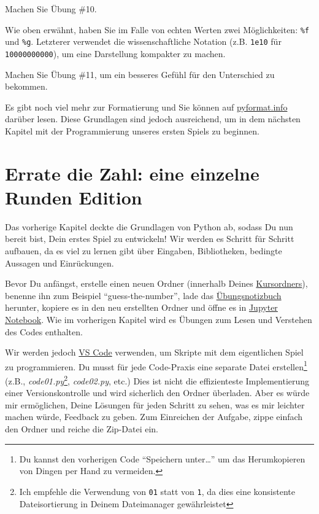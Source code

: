 \documentclass[
]{book}
\begin{document}
Machen Sie Übung \#10.

Wie oben erwähnt, haben Sie im Falle von echten Werten zwei Möglichkeiten: \texttt{\%f} und \texttt{\%g}. Letzterer verwendet die wissenschaftliche Notation (z.B. \texttt{1e10} für \texttt{10000000000}), um eine Darstellung kompakter zu machen.

Machen Sie Übung \#11, um ein besseres Gefühl für den Unterschied zu bekommen.

Es gibt noch viel mehr zur Formatierung und Sie können auf \href{https://pyformat.info/}{pyformat.info} darüber lesen. Diese Grundlagen sind jedoch ausreichend, um in dem nächsten Kapitel mit der Programmierung unseres ersten Spiels zu beginnen.

\hypertarget{guess-the-number-single-round}{%
\chapter{Errate die Zahl: eine einzelne Runden Edition}\label{guess-the-number-single-round}}

Das vorherige Kapitel deckte die Grundlagen von Python ab, sodass Du nun bereit bist, Dein erstes Spiel zu entwickeln! Wir werden es Schritt für Schritt aufbauen, da es viel zu lernen gibt über Eingaben, Bibliotheken, bedingte Aussagen und Einrückungen.

Bevor Du anfängst, erstelle einen neuen Ordner (innerhalb Deines \protect\hyperlink{files-folder}{Kursordners}), benenne ihn zum Beispiel ``guess-the-number'', lade das \href{notebooks/Guess\%20the\%20number\%20-\%20single\%20round.ipynb}{Übungsnotizbuch} herunter, kopiere es in den neu erstellten Ordner und öffne es in \protect\hyperlink{jupyter-notebooks}{Jupyter Notebook}. Wie im vorherigen Kapitel wird es Übungen zum Lesen und Verstehen des Codes enthalten.

Wir werden jedoch \protect\hyperlink{install-vs-code}{VS Code} verwenden, um Skripte mit dem eigentlichen Spiel zu programmieren. Du musst für jede Code-Praxis eine separate Datei erstellen\footnote{Du kannst den vorherigen Code ``Speichern unter\ldots{}'' um das Herumkopieren von Dingen per Hand zu vermeiden.} (z.B., \emph{code01.py}\footnote{Ich empfehle die Verwendung von \texttt{01} statt von \texttt{1}, da dies eine konsistente Dateisortierung in Deinem Dateimanager gewährleistet}, \emph{code02.py}, etc.) Dies ist nicht die effizienteste Implementierung einer Versionskontrolle und wird sicherlich den Ordner überladen. Aber es würde mir ermöglichen, Deine Lösungen für jeden Schritt zu sehen, was es mir leichter machen würde, Feedback zu geben. Zum Einreichen der Aufgabe, zippe einfach den Ordner und reiche die Zip-Datei ein.
\end{document}
